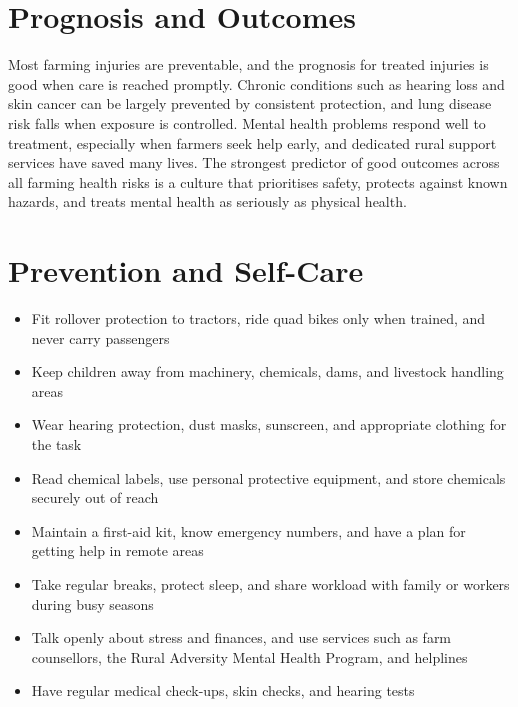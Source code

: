 \section*{Prognosis and Outcomes}
Most farming injuries are preventable, and the prognosis for treated injuries is good when care is reached promptly. Chronic conditions such as hearing loss and skin cancer can be largely prevented by consistent protection, and lung disease risk falls when exposure is controlled. Mental health problems respond well to treatment, especially when farmers seek help early, and dedicated rural support services have saved many lives. The strongest predictor of good outcomes across all farming health risks is a culture that prioritises safety, protects against known hazards, and treats mental health as seriously as physical health.

\section*{Prevention and Self-Care}
\begin{itemize}
    \item Fit rollover protection to tractors, ride quad bikes only when trained, and never carry passengers
    \item Keep children away from machinery, chemicals, dams, and livestock handling areas
    \item Wear hearing protection, dust masks, sunscreen, and appropriate clothing for the task
    \item Read chemical labels, use personal protective equipment, and store chemicals securely out of reach
    \item Maintain a first-aid kit, know emergency numbers, and have a plan for getting help in remote areas
    \item Take regular breaks, protect sleep, and share workload with family or workers during busy seasons
    \item Talk openly about stress and finances, and use services such as farm counsellors, the Rural Adversity Mental Health Program, and helplines
    \item Have regular medical check-ups, skin checks, and hearing tests
\end{itemize}


